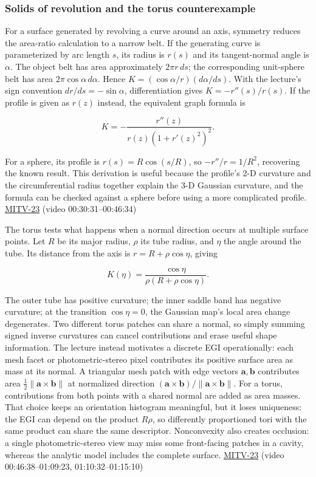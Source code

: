 \subsubsection{Solids of revolution and the torus counterexample}\label{solids-of-revolution-and-the-torus-counterexample}

For a surface generated by revolving a curve around an axis, symmetry reduces the area-ratio calculation to a narrow belt. If the generating curve is parameterized by arc length \(s\), its radius is \(r(s)\) and its tangent-normal angle is \(\alpha\). The object belt has area approximately \(2\pi r\,ds\); the corresponding unit-sphere belt has area \(2\pi\cos\alpha\,d\alpha\). Hence \(K=(\cos\alpha/r)(d\alpha/ds)\). With the lecture's sign convention \(dr/ds=-\sin\alpha\), differentiation gives \(K=-r''(s)/r(s)\). If the profile is given as \(r(z)\) instead, the equivalent graph formula is

\[
K=-\frac{r''(z)}{r(z)\left(1+r'(z)^2\right)^2}.
\]

For a sphere, its profile is \(r(s)=R\cos(s/R)\), so \(-r''/r=1/R^2\), recovering the known result. This derivation is useful because the profile's 2-D curvature and the circumferential radius together explain the 3-D Gaussian curvature, and the formula can be checked against a sphere before using a more complicated profile. \hyperref[04-visual-computing-ii-ch036]{MITV-23} (video 00:30:31--00:46:34)

The torus tests what happens when a normal direction occurs at multiple surface points. Let \(R\) be its major radius, \(\rho\) its tube radius, and \(\eta\) the angle around the tube. Its distance from the axis is \(r=R+\rho\cos\eta\), giving

\[
K(\eta)=\frac{\cos\eta}{\rho(R+\rho\cos\eta)}.
\]

The outer tube has positive curvature; the inner saddle band has negative curvature; at the transition \(\cos\eta=0\), the Gaussian map's local area change degenerates. Two different torus patches can share a normal, so simply summing signed inverse curvatures can cancel contributions and erase useful shape information. The lecture instead motivates a discrete EGI operationally: each mesh facet or photometric-stereo pixel contributes its positive surface area as mass at its normal. A triangular mesh patch with edge vectors \(\mathbf a,\mathbf b\) contributes area \(\tfrac12\|\mathbf a\times\mathbf b\|\) at normalized direction \((\mathbf a\times\mathbf b)/\|\mathbf a\times\mathbf b\|\). For a torus, contributions from both points with a shared normal are added as area masses. That choice keeps an orientation histogram meaningful, but it loses uniqueness: the EGI can depend on the product \(R\rho\), so differently proportioned tori with the same product can share the same descriptor. Nonconvexity also creates occlusion: a single photometric-stereo view may miss some front-facing patches in a cavity, whereas the analytic model includes the complete surface. \hyperref[04-visual-computing-ii-ch036]{MITV-23} (video 00:46:38--01:09:23, 01:10:32--01:15:10)

